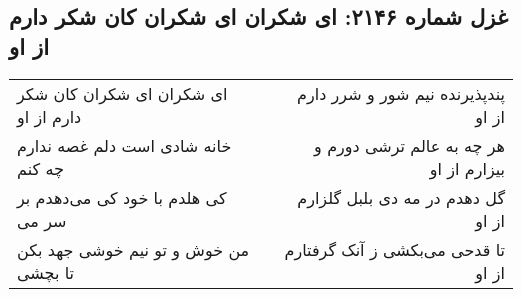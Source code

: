 \begin{center}
\section*{غزل شماره ۲۱۴۶: ای شکران ای شکران کان شکر دارم از او}
\label{sec:2146}
\begin{longtable}{l p{0.5cm} r}
ای شکران ای شکران کان شکر دارم از او
&&
پندپذیرنده نیم شور و شرر دارم از او
\\
خانه شادی است دلم غصه ندارم چه کنم
&&
هر چه به عالم ترشی دورم و بیزارم از او
\\
کی هلدم با خود کی می‌دهدم بر سر می
&&
گل دهدم در مه دی بلبل گلزارم از او
\\
من خوش و تو نیم خوشی جهد بکن تا بچشی
&&
تا قدحی می‌بکشی ز آنک گرفتارم از او
\\
\end{longtable}
\end{center}
